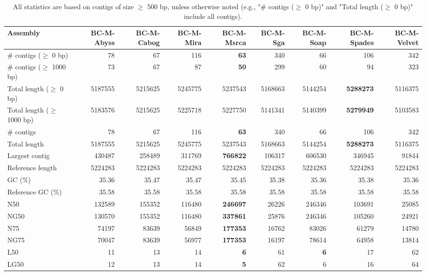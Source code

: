 \documentclass[12pt,a4paper]{article}
\begin{document}
\begin{table}[ht]
\begin{center}
\caption{All statistics are based on contigs of size $\geq$ 500 bp, unless otherwise noted (e.g., "\# contigs ($\geq$ 0 bp)" and "Total length ($\geq$ 0 bp)" include all contigs).}
\begin{tabular}{|l*{8}{|r}|}
\hline
Assembly & BC-M-Abyss & BC-M-Cabog & BC-M-Mira & BC-M-Msrca & BC-M-Sga & BC-M-Soap & BC-M-Spades & BC-M-Velvet \\ \hline
\# contigs ($\geq$ 0 bp) & 78 & 67 & 116 & {\bf 63} & 340 & 66 & 106 & 342 \\ \hline
\# contigs ($\geq$ 1000 bp) & 73 & 67 & 87 & {\bf 50} & 299 & 60 & 94 & 323 \\ \hline
Total length ($\geq$ 0 bp) & 5187555 & 5215625 & 5245775 & 5237543 & 5168663 & 5144254 & {\bf 5288273} & 5116375 \\ \hline
Total length ($\geq$ 1000 bp) & 5183576 & 5215625 & 5225718 & 5227750 & 5141341 & 5140399 & {\bf 5279949} & 5103583 \\ \hline
\# contigs & 78 & 67 & 116 & {\bf 63} & 340 & 66 & 106 & 342 \\ \hline
Total length & 5187555 & 5215625 & 5245775 & 5237543 & 5168663 & 5144254 & {\bf 5288273} & 5116375 \\ \hline
Largest contig & 430487 & 258489 & 311769 & {\bf 766822} & 106317 & 606530 & 346945 & 91844 \\ \hline
Reference length & 5224283 & 5224283 & 5224283 & 5224283 & 5224283 & 5224283 & 5224283 & 5224283 \\ \hline
GC (\%) & 35.36 & 35.47 & 35.47 & 35.45 & 35.38 & 35.36 & 35.38 & 35.36 \\ \hline
Reference GC (\%) & 35.58 & 35.58 & 35.58 & 35.58 & 35.58 & 35.58 & 35.58 & 35.58 \\ \hline
N50 & 132589 & 155352 & 116480 & {\bf 246697} & 26226 & 246346 & 103691 & 25085 \\ \hline
NG50 & 130570 & 155352 & 116480 & {\bf 337861} & 25876 & 246346 & 105260 & 24921 \\ \hline
N75 & 74197 & 83639 & 56849 & {\bf 177353} & 16762 & 83026 & 61279 & 14780 \\ \hline
NG75 & 70047 & 83639 & 56977 & {\bf 177353} & 16197 & 78614 & 64958 & 13814 \\ \hline
L50 & 11 & 13 & 14 & {\bf 6} & 61 & {\bf 6} & 17 & 62 \\ \hline
LG50 & 12 & 13 & 14 & {\bf 5} & 62 & 6 & 16 & 64 \\ \hline

\end{tabular}
\end{center}
\end{table}
\end{document}
